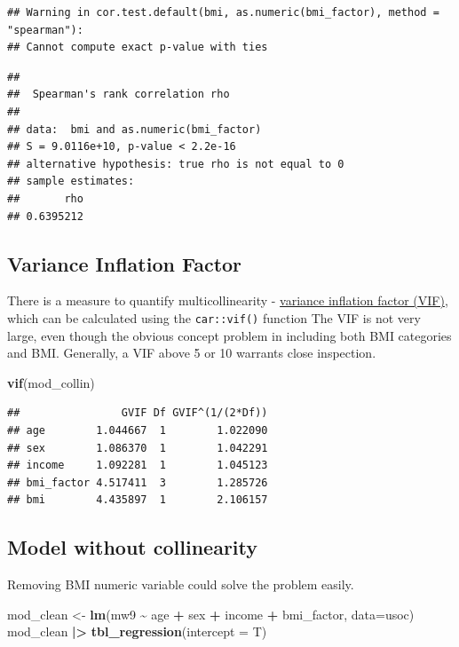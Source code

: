 \documentclass[
]{book}
\newenvironment{Shaded}{\begin{snugshade}}{\end{snugshade}}
\newcommand{\AttributeTok}[1]{\textcolor[rgb]{0.13,0.29,0.53}{#1}}
\newcommand{\FunctionTok}[1]{\textcolor[rgb]{0.13,0.29,0.53}{\textbf{#1}}}
\newcommand{\NormalTok}[1]{#1}
\newcommand{\OtherTok}[1]{\textcolor[rgb]{0.56,0.35,0.01}{#1}}
\newcommand{\SpecialCharTok}[1]{\textcolor[rgb]{0.81,0.36,0.00}{\textbf{#1}}}
\begin{document}
\begin{verbatim}
## Warning in cor.test.default(bmi, as.numeric(bmi_factor), method = "spearman"):
## Cannot compute exact p-value with ties
\end{verbatim}

\begin{verbatim}
## 
##  Spearman's rank correlation rho
## 
## data:  bmi and as.numeric(bmi_factor)
## S = 9.0116e+10, p-value < 2.2e-16
## alternative hypothesis: true rho is not equal to 0
## sample estimates:
##       rho 
## 0.6395212
\end{verbatim}

\subsection{Variance Inflation Factor}\label{variance-inflation-factor}

There is a measure to quantify multicollinearity - \hyperref[acronyms_VIF]{variance inflation factor (VIF)}, which can be calculated using the \texttt{car::vif()} function The VIF is not very large, even though the obvious concept problem in including both BMI categories and BMI. Generally, a VIF above 5 or 10 warrants close inspection.

\begin{Shaded}
\begin{Highlighting}[]
\FunctionTok{vif}\NormalTok{(mod\_collin)}
\end{Highlighting}
\end{Shaded}

\begin{verbatim}
##                GVIF Df GVIF^(1/(2*Df))
## age        1.044667  1        1.022090
## sex        1.086370  1        1.042291
## income     1.092281  1        1.045123
## bmi_factor 4.517411  3        1.285726
## bmi        4.435897  1        2.106157
\end{verbatim}

\subsection{Model without collinearity}\label{model-without-collinearity}

Removing BMI numeric variable could solve the problem easily.

\begin{Shaded}
\begin{Highlighting}[]
\NormalTok{mod\_clean }\OtherTok{\textless{}{-}} \FunctionTok{lm}\NormalTok{(mw9 }\SpecialCharTok{\textasciitilde{}}\NormalTok{ age }\SpecialCharTok{+}\NormalTok{ sex }\SpecialCharTok{+}\NormalTok{ income }\SpecialCharTok{+}\NormalTok{ bmi\_factor, }\AttributeTok{data=}\NormalTok{usoc)}
\NormalTok{mod\_clean }\SpecialCharTok{|\textgreater{}} \FunctionTok{tbl\_regression}\NormalTok{(}\AttributeTok{intercept =}\NormalTok{ T)}
\end{Highlighting}
\end{Shaded}
\end{document}
